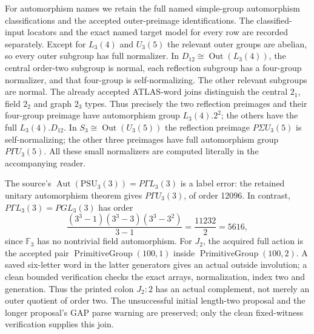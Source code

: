 \documentclass[10pt]{article}
\newcommand{\Aut}{\operatorname{Aut}}\newcommand{\Out}{\operatorname{Out}}
\begin{document}
For automorphism names we retain the full named simple-group
automorphism classifications and the accepted outer-preimage
identifications. The classified-input locators and the exact named target
model for every row are recorded separately. Except for $L_3(4)$ and
$U_3(5)$ the relevant outer groups are abelian, so every outer subgroup
has full normalizer. In $D_{12}\cong\Out(L_3(4))$, the central
order-two subgroup is normal, each reflection subgroup has a four-group
normalizer, and that four-group is self-normalizing. The other relevant
subgroups are normal. The already accepted ATLAS-word joins distinguish
the central $2_1$, field $2_2$ and graph $2_3$ types. Thus precisely the
two reflection preimages and their four-group preimage have automorphism
group $L_3(4).2^2$; the others have the full $L_3(4).D_{12}$.
In $S_3\cong\Out(U_3(5))$ the reflection preimage
$P\Sigma U_3(5)$ is self-normalizing; the other three preimages have
full automorphism group $P\Gamma U_3(5)$. All these small normalizers
are computed literally in the accompanying reader.

The source's $\Aut(\mathrm{PSU}_3(3))=P\Gamma L_3(3)$ is a label
error: the retained unitary automorphism theorem gives $P\Gamma U_3(3)$,
of order 12096. In contrast, $P\Gamma L_3(3)=PGL_3(3)$ has order
\[
 \frac{(3^3-1)(3^3-3)(3^3-3^2)}{3-1}=\frac{11232}{2}=5616,
\]
since $\mathbb F_3$ has no nontrivial field automorphism. For $J_2$,
the acquired full action is the accepted pair
$\operatorname{PrimitiveGroup}(100,1)$ inside
$\operatorname{PrimitiveGroup}(100,2)$. A saved six-letter word in the
latter generators gives an actual outside involution; a clean bounded
verification checks the exact arrays, normalization, index two and
generation. Thus the printed colon $J_2:2$ has an actual complement,
not merely an outer quotient of order two. The unsuccessful initial
length-two proposal and the longer proposal's GAP parse warning are
preserved; only the clean fixed-witness verification supplies this join.
\end{document}
